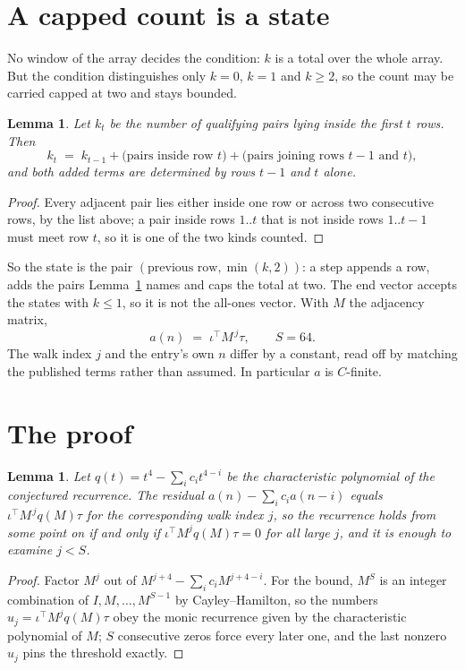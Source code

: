 \documentclass[11pt,a4paper]{article}
\theoremstyle{plain}
\newtheorem{lemma}[theorem]{Lemma}
\theoremstyle{definition}
\begin{document}
\section{A capped count is a state}

No window of the array decides the condition: $k$ is a total over the whole array. But the
condition distinguishes only $k=0$, $k=1$ and $k\ge2$, so the count may be carried capped at
two and stays bounded.

\begin{lemma}\label{lem:cap}
Let $k_t$ be the number of qualifying pairs lying inside the first $t$ rows. Then
\[
k_{t}\;=\;k_{t-1}+\bigl(\text{pairs inside row } t\bigr)
+\bigl(\text{pairs joining rows } t-1 \text{ and } t\bigr),
\]
and both added terms are determined by rows $t-1$ and $t$ alone.
\end{lemma}

\begin{proof}
Every adjacent pair lies either inside one row or across two consecutive rows, by the list
above; a pair inside rows $1..t$ that is not inside rows $1..t-1$ must meet row $t$, so it is
one of the two kinds counted.
\end{proof}

So the state is the pair $(\text{previous row},\min(k,2))$: a step appends a row, adds the
pairs Lemma~\ref{lem:cap} names and caps the total at two. The end vector accepts the states
with $k\le1$, so it is not the all-ones vector. With $M$ the adjacency matrix,
\[
a(n)\;=\;\iota^{\!\top}M^{\,j}\tau ,\qquad S=64.
\]
The walk index $j$ and the entry's own $n$ differ by a constant, read off by matching the
published terms rather than assumed. In particular $a$ is $C$-finite.

\section{The proof}

\begin{lemma}\label{lem:crit}
Let $q(t)=t^{4}-\sum_i c_it^{4-i}$ be the characteristic polynomial of the
conjectured recurrence. The residual $a(n)-\sum_ic_ia(n-i)$ equals
$\iota^{\!\top}M^{\,j}q(M)\tau$ for the corresponding walk index $j$, so the recurrence
holds from some point on if and only if $\iota^{\!\top}M^{j}q(M)\tau=0$ for all large $j$,
and it is enough to examine $j<S$.
\end{lemma}

\begin{proof}
Factor $M^{j}$ out of $M^{j+4}-\sum_ic_iM^{j+4-i}$. For the bound, $M^{S}$
is an integer combination of $I,M,\dots,M^{S-1}$ by Cayley--Hamilton, so the numbers
$u_j=\iota^{\!\top}M^{j}q(M)\tau$ obey the monic recurrence given by the characteristic
polynomial of $M$; $S$ consecutive zeros force every later one, and the last nonzero $u_j$
pins the threshold exactly.
\end{proof}
\end{document}
